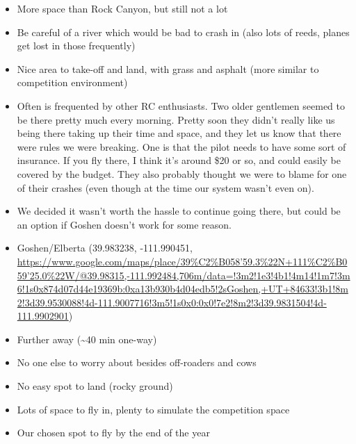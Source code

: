\begin{itemize}
\tightlist
\item
  {More space than Rock Canyon, but still not a lot}
\item
  {Be careful of a river which would be bad to crash in (also lots of
  reeds, planes get lost in those frequently)}
\item
  {Nice area to take-off and land, with grass and asphalt (more similar
  to competition environment)}
\item
  {Often is frequented by other RC enthusiasts. Two older gentlemen
  seemed to be there pretty much every morning. Pretty soon they didn't
  really like us being there taking up their time and space, and they
  let us know that there were rules we were breaking. One is that the
  pilot needs to have some sort of insurance. If you fly there, I think
  it's around \$20 or so, and could easily be covered by the budget.
  They also probably thought we were to blame for one of their crashes
  (even though at the time our system wasn't even on). }
\item
  {We decided it wasn't worth the hassle to continue going there, but
  could be an option if Goshen doesn't work for some reason. }
\end{itemize}

\begin{itemize}
\tightlist
\item
  {Goshen/Elberta (}{39.983238, -111.990451,
  }{\href{https://www.google.com/url?q=https://www.google.com/maps/place/39\%25C2\%25B058'59.3\%2522N\%2B111\%25C2\%25B059'25.0\%2522W/@39.98315,-111.992484,706m/data\%3D!3m2!1e3!4b1!4m14!1m7!3m6!1s0x874d07d44e19369b:0xa13b930b4d04edb5!2sGoshen,\%2BUT\%2B84633!3b1!8m2!3d39.9530088!4d-111.9007716!3m5!1s0x0:0x0!7e2!8m2!3d39.9831504!4d-111.9902901\&sa=D\&ust=1564438983446000}{https://www.google.com/maps/place/39\%C2\%B058'59.3\%22N+111\%C2\%B059'25.0\%22W/@39.98315,-111.992484,706m/data=!3m2!1e3!4b1!4m14!1m7!3m6!1s0x874d07d44e19369b:0xa13b930b4d04edb5!2sGoshen,+UT+84633!3b1!8m2!3d39.9530088!4d-111.9007716!3m5!1s0x0:0x0!7e2!8m2!3d39.9831504!4d-111.9902901}}{)}
\end{itemize}

\begin{itemize}
\tightlist
\item
  {Further away (\textasciitilde{}40 min one-way)}
\item
  {No one else to worry about besides off-roaders and cows}
\item
  {No easy spot to land (rocky ground)}
\item
  {Lots of space to fly in, plenty to simulate the competition space}
\item
  {Our chosen spot to fly by the end of the year}
\end{itemize}

